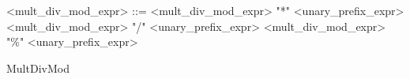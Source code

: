 \begin{Grammar}
 \begin{grammar}

    <mult\_div\_mod\_expr> ::=	<mult\_div\_mod\_expr> "*" <unary\_prefix\_expr>
    \alt <mult\_div\_mod\_expr> "/" <unary\_prefix\_expr>	
    \alt <mult\_div\_mod\_expr> "\%" <unary\_prefix\_expr>
  
 \end{grammar}
 \caption{MultDivMod}\label{gra:MultDivMod}
\end{Grammar}